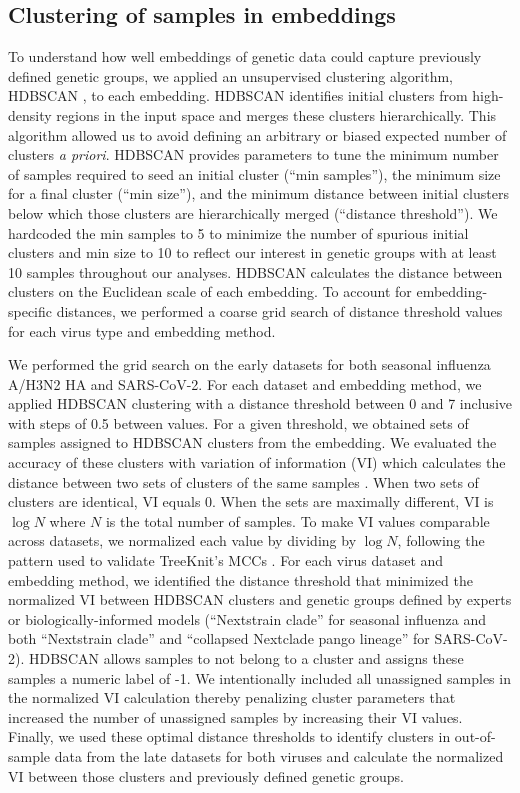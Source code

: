 \documentclass[10pt,letterpaper]{article}
\begin{document}
\subsection*{Clustering of samples in embeddings}

To understand how well embeddings of genetic data could capture previously defined genetic groups, we applied an unsupervised clustering algorithm, HDBSCAN \cite{campello2015hierarchical}, to each embedding.
HDBSCAN identifies initial clusters from high-density regions in the input space and merges these clusters hierarchically.
This algorithm allowed us to avoid defining an arbitrary or biased expected number of clusters \emph{a priori}.
HDBSCAN provides parameters to tune the minimum number of samples required to seed an initial cluster (``min samples''), the minimum size for a final cluster (``min size''), and the minimum distance between initial clusters below which those clusters are hierarchically merged (``distance threshold'').
We hardcoded the min samples to 5 to minimize the number of spurious initial clusters and min size to 10 to reflect our interest in genetic groups with at least 10 samples throughout our analyses.
HDBSCAN calculates the distance between clusters on the Euclidean scale of each embedding.
To account for embedding-specific distances, we performed a coarse grid search of distance threshold values for each virus type and embedding method.

We performed the grid search on the early datasets for both seasonal influenza A/H3N2 HA and SARS-CoV-2.
For each dataset and embedding method, we applied HDBSCAN clustering with a distance threshold between 0 and 7 inclusive with steps of 0.5 between values.
For a given threshold, we obtained sets of samples assigned to HDBSCAN clusters from the embedding.
We evaluated the accuracy of these clusters with variation of information (VI) which calculates the distance between two sets of clusters of the same samples \cite{meilua2003comparing}.
When two sets of clusters are identical, VI equals 0.
When the sets are maximally different, VI is $\log{N}$ where $N$ is the total number of samples.
To make VI values comparable across datasets, we normalized each value by dividing by $\log{N}$, following the pattern used to validate TreeKnit's MCCs \cite{Barrat-Charlaix2022}.
For each virus dataset and embedding method, we identified the distance threshold that minimized the normalized VI between HDBSCAN clusters and genetic groups defined by experts or biologically-informed models (``Nextstrain clade'' for seasonal influenza and both ``Nextstrain clade'' and ``collapsed Nextclade pango lineage'' for SARS-CoV-2).
HDBSCAN allows samples to not belong to a cluster and assigns these samples a numeric label of -1.
We intentionally included all unassigned samples in the normalized VI calculation thereby penalizing cluster parameters that increased the number of unassigned samples by increasing their VI values.
Finally, we used these optimal distance thresholds to identify clusters in out-of-sample data from the late datasets for both viruses and calculate the normalized VI between those clusters and previously defined genetic groups.
\end{document}
